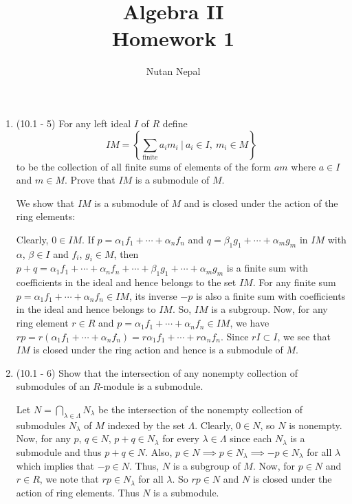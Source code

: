 \documentclass[12pt]{article}
\title{Algebra II\\
\large Homework 1
}
\author{Nutan Nepal}
\begin{document}
\maketitle
\makebox[\linewidth]{\rule{190mm}{.5pt}}
\vspace{0mm}
\begin{enumerate}

\item (10.1 - 5) For any left ideal $I$ of $R$ define
$$IM=\left\{\sum_{\text{finite}}
{a_im_i\ |\ a_i\in I,\ m_i\in M}\right\}$$
to be the collection of all finite sums of elements of
the form $am$ where $a\in I$ and $m\in M$. Prove that
$IM$ is a submodule of $M$.
\begin{mybox}
    We show that $IM$ is a submodule of $M$ and is closed
    under the action of the ring elements:

    \vspace*{2mm}
    Clearly, $0\in IM$.
    If $p=\alpha_1f_1+\cdots+\alpha_n f_n$ and
    $q=\beta_1 g_1+\cdots+\alpha_m g_m$ in $IM$ with
    $\alpha$, $\beta\in I$ and $f_i$, $g_i\in M$, then
    $p+q=\alpha_1f_1+\cdots+\alpha_n f_n+\cdots+
    \beta_1 g_1+\cdots+\alpha_m g_m$ is a finite sum with
    coefficients in the ideal and
    hence belongs to the set $IM$. For any finite sum
    $p=\alpha_1f_1+\cdots+\alpha_n f_n\in IM$, its
    inverse $-p$ is also a finite sum with coefficients
    in the ideal and hence belongs to $IM$.
    So, $IM$ is a subgroup. Now, for any ring element
    $r\in R$ and $p=\alpha_1f_1+\cdots+\alpha_n f_n \in
    IM$, we have $rp=r(\alpha_1f_1+\cdots+\alpha_n f_n)=
    r\alpha_1f_1+\cdots+r\alpha_n f_n$. Since $rI\subset
    I$, we see that $IM$ is closed under the ring action
    and hence is a submodule of $M$.
\end{mybox}

\item (10.1 - 6) Show that the intersection of any
nonempty collection of submodules of an $R$-module is
a submodule.

\begin{mybox}
Let $N=\bigcap_{\lambda\in \Lambda}{N_\lambda}$ be the
intersection of the nonempty collection of submodules
$N_\lambda$ of $M$ indexed by the set $\Lambda$. Clearly,
$0\in N$, so $N$ is nonempty. Now, for any $p$, $q\in N$,
$p+q\in N_\lambda$ for every $\lambda\in\Lambda$ since
each $N_\lambda$ is a submodule and thus $p+q\in N$. Also,
$p\in N\implies p\in N_\lambda\implies -p\in N_\lambda$
for all $\lambda$ which implies that $-p\in N$. Thus,
$N$ is a subgroup of $M$. Now, for $p\in N$ and $r\in R$,
we note that $rp\in N_\lambda$ for all $\lambda$. So
$rp\in N$ and $N$ is closed under the action of ring
elements. Thus $N$ is a submodule.
\end{mybox}



\end{enumerate}
\end{document}
